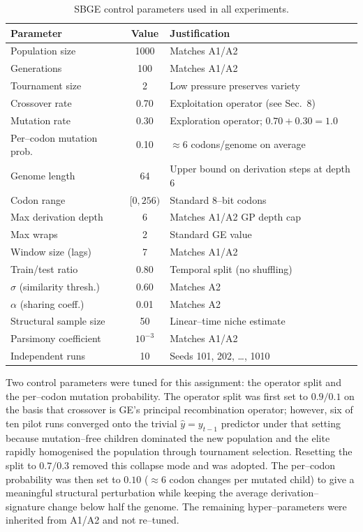 \documentclass[12pt,a4paper]{article}
\begin{document}
\begin{table}[H]
\centering
\begin{tabular}{l c l}
\toprule
\textbf{Parameter} & \textbf{Value} & \textbf{Justification} \\
\midrule
Population size              & 1000     & Matches A1/A2 \\
Generations                  & 100      & Matches A1/A2 \\
Tournament size              & 2        & Low pressure preserves variety \\
Crossover rate               & 0.70     & Exploitation operator (see Sec.~8) \\
Mutation rate                & 0.30     & Exploration operator; $0.70+0.30=1.0$ \\
Per--codon mutation prob.    & 0.10     & $\approx 6$ codons/genome on average \\
Genome length                & 64       & Upper bound on derivation steps at depth 6 \\
Codon range                  & $[0,256)$ & Standard 8--bit codons \\
Max derivation depth         & 6        & Matches A1/A2 GP depth cap \\
Max wraps                    & 2        & Standard GE value \\
Window size (lags)           & 7        & Matches A1/A2 \\
Train/test ratio             & 0.80     & Temporal split (no shuffling) \\
$\sigma$ (similarity thresh.) & 0.60    & Matches A2 \\
$\alpha$ (sharing coeff.)    & 0.01     & Matches A2 \\
Structural sample size       & 50       & Linear--time niche estimate \\
Parsimony coefficient        & $10^{-3}$ & Matches A1/A2 \\
Independent runs             & 10       & Seeds 101, 202, \ldots, 1010 \\
\bottomrule
\end{tabular}
\caption{SBGE control parameters used in all experiments.}
\end{table}

Two control parameters were tuned for this assignment: the operator
split and the per--codon mutation probability. The operator split was
first set to $0.9/0.1$ on the basis that crossover is GE's principal
recombination operator; however, six of ten pilot runs converged onto
the trivial $\hat{y}=y_{t-1}$ predictor under that setting because
mutation--free children dominated the new population and the elite
rapidly homogenised the population through tournament selection.
Resetting the split to $0.7/0.3$ removed this collapse mode and was
adopted. The per--codon probability was then set to $0.10$ ($\approx 6$
codon changes per mutated child) to give a meaningful structural
perturbation while keeping the average derivation--signature change
below half the genome. The remaining hyper--parameters were inherited
from A1/A2 and not re--tuned.
\end{document}
